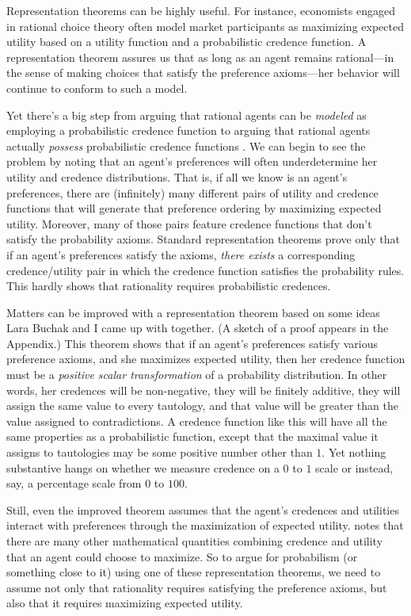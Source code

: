 Representation theorems can be highly useful. For instance, economists engaged in rational choice theory often model market participants as maximizing expected utility based on a utility function and a probabilistic credence function. A representation theorem assures us that as long as an agent remains rational---in the sense of making choices that satisfy the preference axioms---her behavior will continue to conform to such a model.

Yet there's a big step from arguing that rational agents can be \emph{modeled} as employing a probabilistic credence function to arguing that rational agents actually \emph{possess} probabilistic credence functions \citep{HajekArguments,MeachamWeisberg}. We can begin to see the problem by noting that an agent's preferences will often underdetermine her utility and credence distributions. That is, if all we know is an agent's preferences, there are (infinitely) many different pairs of utility and credence functions that will generate that preference ordering by maximizing expected utility. Moreover, many of those pairs feature credence functions that don't satisfy the probability axioms. Standard representation theorems prove only that if an agent's preferences satisfy the axioms, \emph{there exists} a corresponding credence/utility pair in which the credence function satisfies the probability rules. This hardly shows that rationality requires probabilistic credences.

Matters can be improved with a representation theorem based on some ideas Lara Buchak and I came up with together. (A sketch of a proof appears in the Appendix.) This theorem shows that if an agent's preferences satisfy various preference axioms, and she maximizes expected utility, then her credence function must be a \emph{positive scalar transformation} of a probability distribution. In other words, her credences will be non-negative, they will be finitely additive, they will assign the same value to every tautology, and that value will be greater than the value assigned to contradictions. A credence function like this will have all the same properties as a probabilistic function, except that the maximal value it assigns to tautologies may be some positive number other than $1$. Yet nothing substantive hangs on whether we measure credence on a $0$ to $1$ scale or instead, say, a percentage scale from $0$ to $100$.

Still, even the improved theorem assumes that the agent's credences and utilities interact with preferences through the maximization of expected utility. \citet{ZyndaRepresentation} notes that there are many other mathematical quantities combining credence and utility that an agent could choose to maximize. So to argue for probabilism (or something close to it) using one of these representation theorems, we need to assume not only that rationality requires satisfying the preference axioms, but also that it requires maximizing expected utility.

